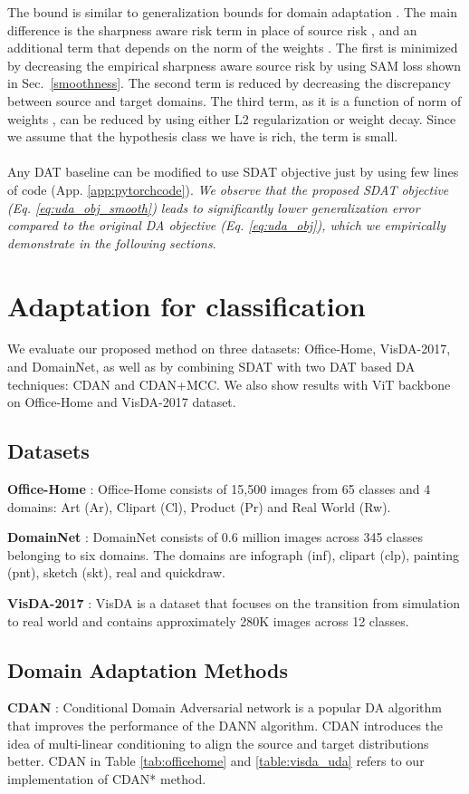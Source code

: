 \documentclass[table,dvipsnames]{article}
\theoremstyle{plain}
\theoremstyle{definition}
\theoremstyle{remark}
\begin{document}
The bound is similar to generalization bounds for domain adaptation \citep{ben2010theory, acuna2021f}. The main difference is the sharpness aware risk term  in place of source risk , and an additional term that depends on the norm of the weights . 
The first is minimized by decreasing the empirical sharpness aware source risk by using SAM loss shown in Sec.\ \ref{smoothness}. The second term is reduced by decreasing the discrepancy between source and target domains. The third term, as it is a function of norm of weights , can be reduced by using either L2 regularization or weight decay. Since we assume that the  hypothesis class we have is rich, the  term is small. \\ \\
Any DAT baseline can be modified to use SDAT objective just by using few lines of code (App. \ref{app:pytorchcode}). \emph{We observe that the proposed SDAT objective (Eq. \ref{eq:uda_obj_smooth}) leads to significantly lower generalization error compared to the original DA objective (Eq. \ref{eq:uda_obj}), which we empirically demonstrate in the following sections}.
\section{Adaptation for classification}


We evaluate our proposed method on three datasets: Office-Home, VisDA-2017, and DomainNet, as well as by combining SDAT with two DAT based DA techniques: CDAN and CDAN+MCC. We also show results with ViT backbone on Office-Home and VisDA-2017 dataset.
\subsection{Datasets}
\textbf{Office-Home} \citep{venkateswara2017Deep}: Office-Home consists of 15,500 images from 65 classes and 4 domains: Art (Ar), Clipart (Cl), Product (Pr) and Real World (Rw).

\textbf{DomainNet }\citep{peng2019moment}: DomainNet consists of 0.6 million images across 345 classes belonging to six domains. The domains are infograph (inf), clipart (clp), painting (pnt), sketch (skt), real and quickdraw.


\textbf{VisDA-2017 }\citep{visda2017}:  VisDA is a dataset that focuses on the transition from simulation to real world and contains approximately 280K images across 12 classes. 




\subsection{Domain Adaptation Methods}
\textbf{CDAN }\citep{long2018conditional}: Conditional Domain Adversarial network is a popular DA algorithm that improves the performance of the DANN algorithm. CDAN introduces the idea of multi-linear conditioning to align the source and target distributions better. CDAN in Table \ref{tab:officehome} and \ref{table:visda_uda} refers to our implementation of CDAN* \cite{long2018conditional} method. 
\end{document}
